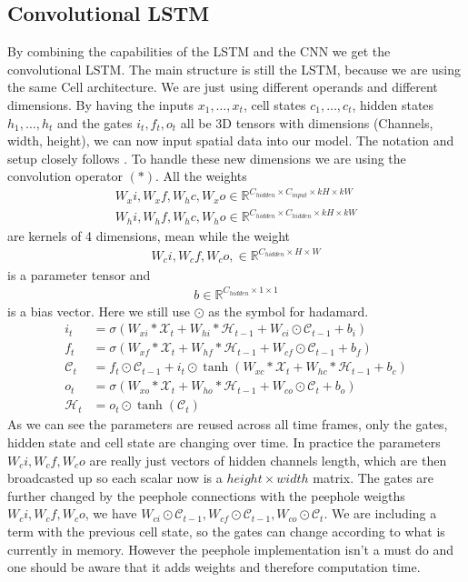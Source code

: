 \documentclass[a4paper,12pt]{article}
\begin{document}
\subsection{Convolutional LSTM}
By combining the capabilities of the LSTM and the CNN we get the convolutional LSTM. The main structure is still the LSTM, because we are using the same Cell architecture. We are just using different operands and different dimensions. By having the inputs $x_1, \dots, x_t$, cell states $c_1,\dots, c_t$, hidden states $h_1, \dots, h_t$ and the gates $i_t, f_t, o_t$ all be 3D tensors with dimensions (Channels, width, height), we can now input spatial data into our model.
The notation and setup closely follows \cite{Shi2015ConvolutionalLN}.
To handle these new dimensions we are using the convolution operator $(*)$. All the weights
\begin{align*}
  W_xi, W_xf, W_hc, W_xo \in \mathbb{R}^{C_{hidden} \times C_{input} \times kH \times kW}\\
 W_hi, W_hf, W_hc, W_ho \in \mathbb{R}^{C_{hidden} \times C_{hidden} \times kH \times kW} 
\end{align*}
 are kernels of 4 dimensions, mean while the weight 
 \begin{align*}
  W_ci, W_cf, W_co, \in \mathbb{R}^{C_{hidden} \times H \times W}
 \end{align*}
 is a parameter tensor and 
 \begin{align*}
   b \in \mathbb{R}^{C_{hidden} \times 1 \times 1}
 \end{align*}
is a bias vector.
Here we still use $\odot$ as the symbol for hadamard.
\begin{align}
i_t &= \sigma(W_{xi} * \mathcal{X}_t + W_{hi} * \mathcal{H}_{t-1} + W_{ci} \odot \mathcal{C}_{t-1} + b_i) \\
f_t &= \sigma(W_{xf} * \mathcal{X}_t + W_{hf} * \mathcal{H}_{t-1} + W_{cf} \odot \mathcal{C}_{t-1} + b_f) \\
\mathcal{C}_t &= f_t \odot \mathcal{C}_{t-1} + i_t \odot \tanh(W_{xc} * \mathcal{X}_t + W_{hc} * \mathcal{H}_{t-1} + b_c) \\
o_t &= \sigma(W_{xo} * \mathcal{X}_t + W_{ho} * \mathcal{H}_{t-1} + W_{co} \odot \mathcal{C}_t + b_o) \\
\mathcal{H}_t &= o_t \odot \tanh(\mathcal{C}_t)
\end{align}
As we can see the parameters are reused across all time frames, only the gates, hidden state and cell state are changing over time. In practice the parameters $W_ci, W_cf, W_co$ are really just vectors of hidden channels length, which are then broadcasted up so each scalar now is a $height \times width$ matrix. 
The gates are further changed by the peephole connections with the peephole weigths $W_ci, W_cf, W_co$, we have $W_{ci} \odot \mathcal{C}_{t-1}, W_{cf} \odot \mathcal{C}_{t-1}, W_{co} \odot \mathcal{C}_t $. We are including a term with the previous cell state, so the gates can change according to what is currently in memory. However the peephole implementation isn't a must do and one should be aware that it adds weights and therefore computation time.
\end{document}
